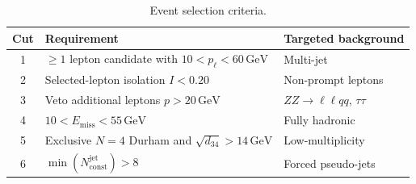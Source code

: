 \documentclass[a4paper,11pt]{article}
\newcommand{\GeV}{\ensuremath{\,\mathrm{GeV}}\xspace}
\begin{document}
\begin{table}[tb]
\centering
\caption{Event selection criteria.}
\label{tab:cuts}
\small
\begin{tabular}{cll}
\toprule
Cut & Requirement & Targeted background \\
\midrule
1 & $\geq 1$ lepton candidate with $10 < p_\ell < 60\GeV$ & Multi-jet \\
2 & Selected-lepton isolation $I < 0.20$ & Non-prompt leptons \\
3 & Veto additional leptons $p > 20\GeV$ & $ZZ \to \ell\ell qq$, $\tau\tau$ \\
4 & $10 < E_{\mathrm{miss}} < 55\GeV$ & Fully hadronic \\
5 & Exclusive $N=4$ Durham and $\sqrt{d_{34}}>14\GeV$ & Low-multiplicity \\
6 & $\min(N_{\mathrm{const}}^{\mathrm{jet}})>8$ & Forced pseudo-jets \\
\bottomrule
\end{tabular}
\end{table}
\end{document}
